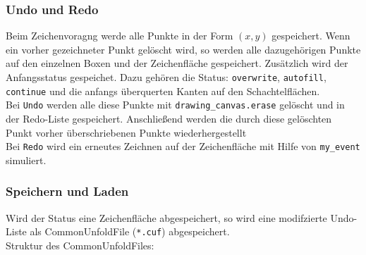 \subsubsection{Undo und Redo}
\label{subsubsec:undoRedo}

Beim Zeichenvoragng werde alle Punkte in der Form $(x,y)$ gespeichert. Wenn ein vorher gezeichneter Punkt gelöscht wird, so werden alle dazugehörigen Punkte auf den einzelnen Boxen und der Zeichenfläche gespeichert. Zusätzlich wird der Anfangsstatus gespeichet. Dazu gehören die Status: \texttt{overwrite}, \texttt{autofill}, \texttt{continue} und die anfangs überquerten Kanten auf den Schachtelflächen.\\

Bei \texttt{Undo} werden alle diese Punkte mit \texttt{drawing\_canvas.erase} gelöscht und in der Redo-Liste gespeichert. Anschließend werden die durch diese gelöschten Punkt vorher überschriebenen Punkte wiederhergestellt\\

Bei \texttt{Redo} wird ein erneutes Zeichnen auf der Zeichenfläche mit Hilfe
von \texttt{my\_event} simuliert.\\


\subsubsection{Speichern und Laden}
\label{subsubsec:speichernLaden}
Wird der Status eine Zeichenfläche abgespeichert, so wird eine modifzierte Undo-Liste als CommonUnfoldFile (\texttt{*.cuf}) abgespeichert.\\

Struktur des CommonUnfoldFiles:

